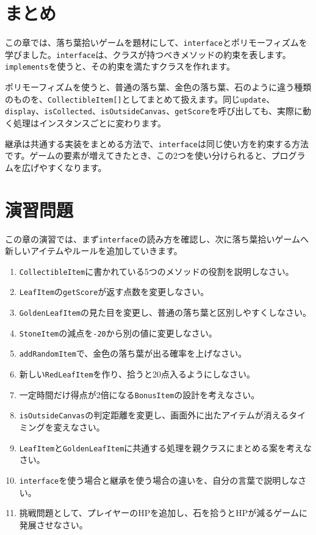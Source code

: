\section{まとめ}

この章では、落ち葉拾いゲームを題材にして、\texttt{interface}とポリモーフィズムを学びました。\texttt{interface}は、クラスが持つべきメソッドの約束を表します。\texttt{implements}を使うと、その約束を満たすクラスを作れます。

ポリモーフィズムを使うと、普通の落ち葉、金色の落ち葉、石のように違う種類のものを、\texttt{CollectibleItem[]}としてまとめて扱えます。同じ\texttt{update}、\texttt{display}、\texttt{isCollected}、\texttt{isOutsideCanvas}、\texttt{getScore}を呼び出しても、実際に動く処理はインスタンスごとに変わります。

継承は共通する実装をまとめる方法で、\texttt{interface}は同じ使い方を約束する方法です。ゲームの要素が増えてきたとき、この2つを使い分けられると、プログラムを広げやすくなります。

\section{演習問題}

この章の演習では、まず\texttt{interface}の読み方を確認し、次に落ち葉拾いゲームへ新しいアイテムやルールを追加していきます。

\begin{enumerate}
    \item \texttt{CollectibleItem}に書かれている5つのメソッドの役割を説明しなさい。
    \item \texttt{LeafItem}の\texttt{getScore}が返す点数を変更しなさい。
    \item \texttt{GoldenLeafItem}の見た目を変更し、普通の落ち葉と区別しやすくしなさい。
    \item \texttt{StoneItem}の減点を\texttt{-20}から別の値に変更しなさい。
    \item \texttt{addRandomItem}で、金色の落ち葉が出る確率を上げなさい。
    \item 新しい\texttt{RedLeafItem}を作り、拾うと20点入るようにしなさい。
    \item 一定時間だけ得点が2倍になる\texttt{BonusItem}の設計を考えなさい。
    \item \texttt{isOutsideCanvas}の判定距離を変更し、画面外に出たアイテムが消えるタイミングを変えなさい。
    \item \texttt{LeafItem}と\texttt{GoldenLeafItem}に共通する処理を親クラスにまとめる案を考えなさい。
    \item \texttt{interface}を使う場合と継承を使う場合の違いを、自分の言葉で説明しなさい。
    \item 挑戦問題として、プレイヤーのHPを追加し、石を拾うとHPが減るゲームに発展させなさい。
\end{enumerate}

